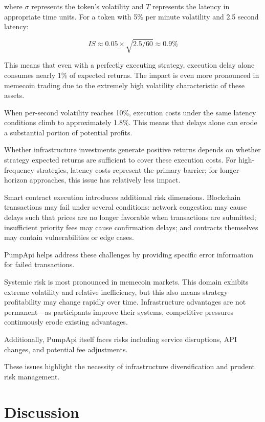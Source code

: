 \documentclass[12pt,a4paper]{article}
\begin{document}
where $\sigma$ represents the token's volatility and $T$ represents the latency in appropriate time units. For a token with 5\% per minute volatility and 2.5 second latency:

\begin{equation}
IS \approx 0.05 \times \sqrt{2.5/60} \approx 0.9\%
\end{equation}

This means that even with a perfectly executing strategy, execution delay alone consumes nearly 1\% of expected returns. The impact is even more pronounced in memecoin trading due to the extremely high volatility characteristic of these assets.

When per-second volatility reaches 10\%, execution costs under the same latency conditions climb to approximately 1.8\%. This means that delays alone can erode a substantial portion of potential profits.

Whether infrastructure investments generate positive returns depends on whether strategy expected returns are sufficient to cover these execution costs. For high-frequency strategies, latency costs represent the primary barrier; for longer-horizon approaches, this issue has relatively less impact.

Smart contract execution introduces additional risk dimensions. Blockchain transactions may fail under several conditions: network congestion may cause delays such that prices are no longer favorable when transactions are submitted; insufficient priority fees may cause confirmation delays; and contracts themselves may contain vulnerabilities or edge cases.

PumpApi helps address these challenges by providing specific error information for failed transactions.

Systemic risk is most pronounced in memecoin markets. This domain exhibits extreme volatility and relative inefficiency, but this also means strategy profitability may change rapidly over time. Infrastructure advantages are not permanent—as participants improve their systems, competitive pressures continuously erode existing advantages.

Additionally, PumpApi itself faces risks including service disruptions, API changes, and potential fee adjustments.

These issues highlight the necessity of infrastructure diversification and prudent risk management.
\section{Discussion}
\end{document}
